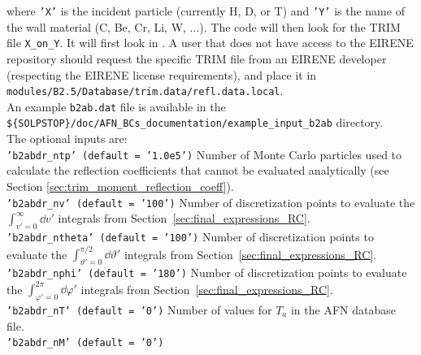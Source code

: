 \noindent where {\tt 'X'} is the incident particle (currently H, D, or T) and {\tt 'Y'} is the name of the wall material (C, Be, Cr, Li, W, ...). The code will then look for the TRIM file {\tt X\_on\_Y}. It will first look in . A user that does not have access to the EIRENE repository should request the specific TRIM file from an EIRENE developer (respecting the EIRENE license requirements), and place it in {\tt modules/B2.5/Database/trim.data/refl.data.local}. \newline
\\
An example {\tt b2ab.dat} file is available in the {\tt \$\{SOLPSTOP\}/doc/AFN\_BCs\_documentation/example\_input\_b2ab} directory. \newline
\\
The optional inputs are: \newline
\\
{\tt 'b2abdr\_ntp' (default = '1.0e5')} \newline
Number of Monte Carlo particles used to calculate the reflection coefficients that cannot be evaluated analytically (see Section \ref{sec:trim_moment_reflection_coeff}). \newline
\\
{\tt 'b2abdr\_nv' (default = '100')} \newline
Number of discretization points to evaluate the $\int_{v'=0}^{\infty} \dd v'$ integrals from Section~\ref{sec:final_expressions_RC}. \newline
\\
{\tt 'b2abdr\_ntheta' (default = '100')} \newline
Number of discretization points to evaluate the $\int_{\vartheta'=0}^{\pi/2} \dd \vartheta'$ integrals from Section~\ref{sec:final_expressions_RC}. \newline
\\
{\tt 'b2abdr\_nphi' (default = '180')} \newline
Number of discretization points to evaluate the $\int_{\varphi'=0}^{2 \pi} \dd \varphi'$ integrals from Section~\ref{sec:final_expressions_RC}. \newline
\\
{\tt 'b2abdr\_nT' (default = '0')} \newline
Number of values for $T_a$ in the AFN database file. \newline
\\
{\tt 'b2abdr\_nM' (default = '0')} \newline
